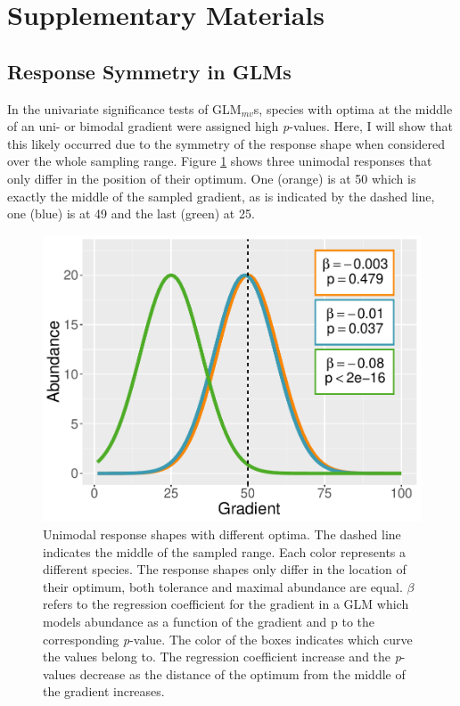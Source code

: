 
\section{Supplementary Materials}


	\subsection{Response Symmetry in GLMs}
		\normalsize
		In the univariate significance tests of  GLM$_{mv}$s, species with optima at the middle of an uni- or bimodal gradient were assigned high \textit{p}-values. 
		Here, I will show that this likely occurred due to the symmetry of the response shape when considered over the whole sampling range. 
		Figure \ref{fig:uniglm} shows three unimodal responses that only differ in the position of their optimum. One (orange) is at 50 which is exactly the middle of the sampled gradient, as is indicated by the dashed line, one (blue) is at 49 and the last (green) at 25. 
		
		
		\begin{figure}[h!]
			\centering
			\includegraphics[width=0.5\linewidth]{../02_Figures/uniglm}
			\caption{
					Unimodal response shapes with different optima.
					The dashed line indicates the middle of the sampled range.
					Each color represents a different species.
					The response shapes only differ in the location of their optimum, both tolerance and maximal abundance are equal.
					$\beta$ refers to the regression coefficient for the gradient in a GLM which models abundance as a function of the gradient and p to the corresponding \textit{p}-value.
					The color of the boxes indicates which curve the values belong to.
					The regression coefficient increase and the \textit{p}-values decrease as the distance of the optimum from the middle of the gradient increases.  
					}
			\label{fig:uniglm}
		\end{figure}
		   
